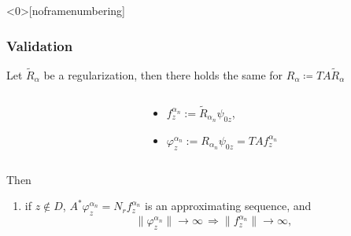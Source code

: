 \documentclass[10pt,xcolor={dvipsnames}]{beamer}
\theoremstyle{plain}
\theoremstyle{plain}
\let\phi\varphi
\begin{document}
\begin{frame}<0>[noframenumbering]
 \frametitle{Validation}
Let $\tilde{R}_\alpha$ be a regularization, then there holds the same for $R_\alpha\coloneqq TA\tilde{R}_\alpha$
\begin{columns}[T]
 \begin{column}{0.5\textwidth}
 \end{column}
 \begin{column}{0.5\textwidth}
 \begin{itemize}
  \item $f_z^{\alpha_n}:=\tilde{R}_{\alpha_n}\psi_{0z}$,
  \item $\phi_z^{\alpha_n}:=R_{\alpha_n}\psi_{0z} = TA f_z^{\alpha_n}$
 \end{itemize}
  \end{column}
\end{columns}

\begin{corollary}
Then
\begin{enumerate}
 \item if $z\notin D$, $A^*\phi_z^{\alpha_n} = {N_r}f_z^{\alpha_n}$ is an 
 approximating sequence, and
\begin{equation*}
 \|\phi_z^{\alpha_n}\|\to\infty\,\Rightarrow\|f_z^{\alpha_n}\|\to\infty,
\end{equation*}


\end{enumerate}
\end{corollary}
\end{frame}
\end{document}
